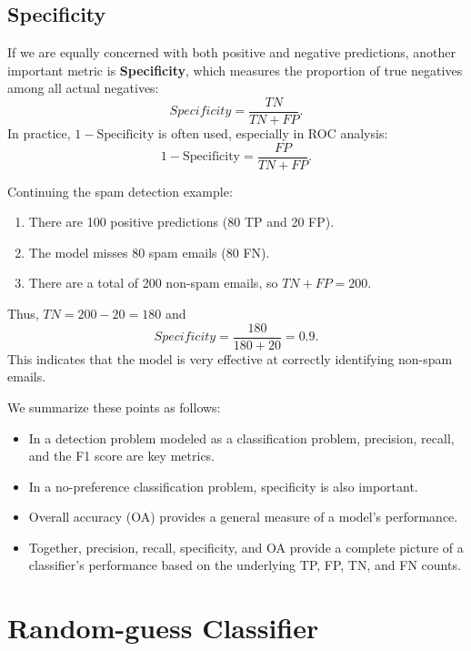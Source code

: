\documentclass[12pt]{article}
\begin{document}
\subsection{Specificity}
If we are equally concerned with both positive and negative predictions, another important metric is \textbf{Specificity}, which measures the proportion of true negatives among all actual negatives:
\begin{equation}
Specificity = \frac{TN}{TN + FP}.
\end{equation}
In practice, \(1 - \text{Specificity}\) is often used, especially in ROC analysis:
\begin{equation}
1 - \text{Specificity} = \frac{FP}{TN + FP}.
\end{equation}

\begin{tcolorbox}

Continuing the spam detection example:
\begin{enumerate}
    \item There are 100 positive predictions (80 TP and 20 FP).
    \item The model misses 80 spam emails (80 FN).
    \item There are a total of 200 non-spam emails, so \(TN + FP = 200\).
\end{enumerate}
Thus, \(TN = 200 - 20 = 180\) and
\[
Specificity = \frac{180}{180+20} = 0.9.
\]
This indicates that the model is very effective at correctly identifying non-spam emails.
\end{tcolorbox}

We summarize these points as follows:
\begin{itemize}
    \item In a detection problem modeled as a classification problem, precision, recall, and the F1 score are key metrics.
    \item In a no-preference classification problem, specificity is also important.
    \item Overall accuracy (OA) provides a general measure of a model's performance.
    \item Together, precision, recall, specificity, and OA provide a complete picture of a classifier's performance based on the underlying TP, FP, TN, and FN counts.
\end{itemize}

\section{Random-guess Classifier}
\end{document}
